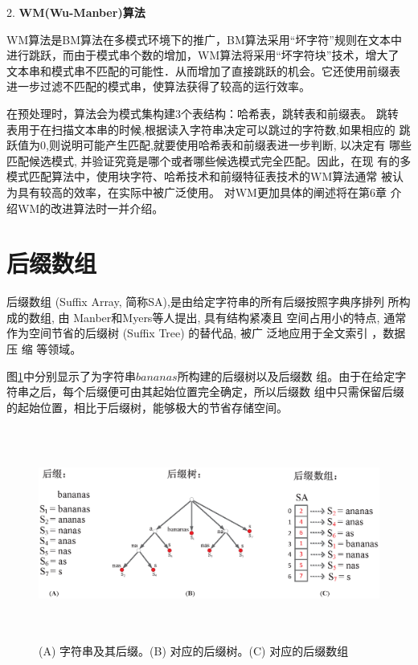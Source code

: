 2. \textbf{WM(Wu-Manber)算法}

 WM算法是BM算法在多模式环境下的推广，BM算法采用“坏字符”规则在文本中
进行跳跃，而由于模式串个数的增加，WM算法将采用“坏字符块”技术，增大了
文本串和模式串不匹配的可能性．从而增加了直接跳跃的机会。它还使用前缀表
进一步过滤不匹配的模式串，使算法获得了较高的运行效率。

在预处理时，算法会为模式集构建3个表结构：哈希表，跳转表和前缀表。 跳转
表用于在扫描文本串的时候,根据读入字符串决定可以跳过的字符数,如果相应的
跳跃值为0,则说明可能产生匹配,就要使用哈希表和前缀表进一步判断, 以决定有
哪些匹配候选模式, 并验证究竟是哪个或者哪些候选模式完全匹配。因此，在现
有的多模式匹配算法中，使用块字符、哈希技术和前缀特征表技术的WM算法通常
被认为具有较高的效率，在实际中被广泛使用。 对WM更加具体的阐述将在第6章
介绍WM的改进算法时一并介绍。

\section{后缀数组}

后缀数组 (Suffix Array, 简称SA),是由给定字符串的所有后缀按照字典序排列
所构成的数组, 由 Manber和Myers等人提出\cite{Manber1993}, 具有结构紧凑且
空间占用小的特点, 通常作为空间节省的后缀树 (Suffix Tree) 的替代品, 被广
泛地应用于全文索引 \cite{Strate2015,Fischer2017,Arroyuelo2014}，数据压
缩\cite{Louza2015,Chien2015,Pradhan2016,Brisaboa2015} 等领域。

图\ref{fig:suffix}中分别显示了为字符串$bananas$所构建的后缀树以及后缀数
组。由于在给定字符串之后，每个后缀便可由其起始位置完全确定，所以后缀数
组中只需保留后缀的起始位置，相比于后缀树，能够极大的节省存储空间。


\begin{figure}[H]
  \centering
  \includegraphics[height=7cm ,width=15cm]{figures/1_Introduction/Suffix.eps}
  \caption{(A) 字符串及其后缀。(B) 对应的后缀树。(C) 对应的后缀数组}
  \label{fig:suffix}
\end{figure}

